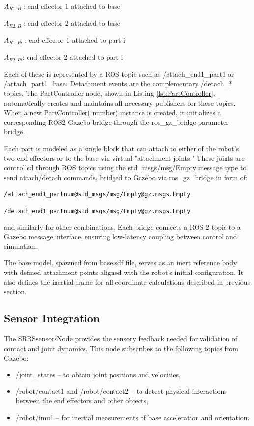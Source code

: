 $A_{R1,B}$ : end-effector 1 attached to base

$ A_{R2,B}$ : end-effector 2 attached to base

$ A_{R1,Pi}$ : end-effector 1 attached to part i 

$ A_{R2,Pi} $: end-effector 2 attached to part i 

Each of these is represented by a ROS topic such as /attach\_end1\_part1 or 
/attach\_part1\_base. Detachment events are the complementary /detach\_* 
topics. 
The PartController node, shown in Listing \ref{lst:PartController},
automatically creates and maintains all 
necessary publishers for these topics. When a new PartController(
number) instance is created, it initializes a corresponding ROS2-Gazebo bridge 
through the ros\_gz\_bridge parameter bridge.

Each part is modeled as a single block that can 
attach to either of the robot’s two end effectors or to the base via 
virtual "attachment joints." These joints are controlled through ROS 
topics using the std\_msgs/msg/Empty message type to send attach/detach 
commands, bridged to Gazebo via ros\_gz\_bridge in form of:

\texttt{/attach\_end1\_part{num}@std\_msgs/msg/Empty@gz.msgs.Empty }

\texttt{/detach\_end1\_part{num}@std\_msgs/msg/Empty@gz.msgs.Empty }

and similarly for other combinations. Each bridge connects a ROS 2 
topic to a Gazebo message interface, ensuring low-latency coupling between 
control and simulation.

The base model, spawned from  base.sdf file, serves as an inert reference body with defined 
attachment points aligned with the robot's initial configuration. 
It also defines the inertial frame for all coordinate calculations 
described in previous section.

\subsection{Sensor Integration}

The SRRSsensorsNode provides the sensory feedback needed for validation of 
contact and joint dynamics. This node subscribes to the following topics from
Gazebo:
\begin{itemize}
    
   \item /joint\_states – to obtain joint positions and velocities,

   \item /robot/contact1 and /robot/contact2 – to detect physical interactions between the end effectors and other objects,

   \item /robot/imu1 – for inertial measurements of base acceleration and orientation.
\end{itemize}

